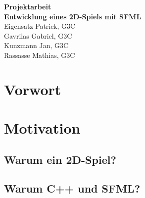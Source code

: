 \documentclass[12pt,a4paper]{scrartcl}
\begin{document}
\begin{titlepage}
\begin{center}
\vspace*{3cm}
\textbf{\huge{Projektarbeit}}\\
\vspace*{2cm}
\textbf{\large{Entwicklung eines 2D-Spiels mit SFML}}\\
\vspace*{5cm}
Eigensatz Patrick, G3C\\
Gavrilas Gabriel, G3C\\
Kunzmann Jan, G3C\\
Rassasse Mathias, G3C

\end{center}

\end{titlepage}


\newpage

\setcounter{page}{1}
\section*{Vorwort}
\blindtext[1]

\newpage


\tableofcontents

\newpage


\section{Motivation}
\subsection{Warum ein 2D-Spiel?}
\subsection{Warum C++ und SFML?}
\end{document}
